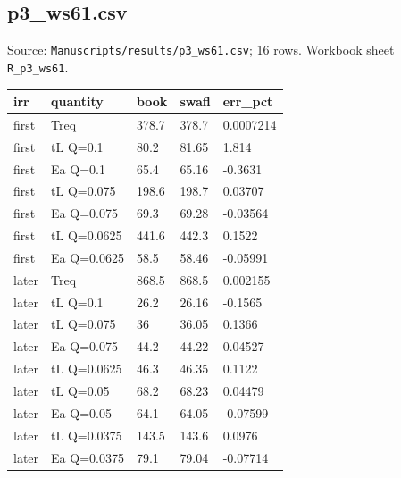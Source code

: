 \subsection*{p3\_ws61.csv}
\noindent\small Source: \nolinkurl{Manuscripts/results/p3_ws61.csv}; 16 rows. Workbook sheet \texttt{R\_p3\_ws61}.\par
{\scriptsize\setlength{\tabcolsep}{3pt}\begin{longtable}{lllll}
\toprule
\textbf{irr} & \textbf{quantity} & \textbf{book} & \textbf{swafl} & \textbf{err\_\allowbreak{}pct}\\\midrule\endhead
{}first & Treq & 378.7 & 378.7 & 0.0007214\\
{}first & tL Q=0.1 & 80.2 & 81.65 & 1.814\\
{}first & Ea Q=0.1 & 65.4 & 65.16 & -0.3631\\
{}first & tL Q=0.075 & 198.6 & 198.7 & 0.03707\\
{}first & Ea Q=0.075 & 69.3 & 69.28 & -0.03564\\
{}first & tL Q=0.0625 & 441.6 & 442.3 & 0.1522\\
{}first & Ea Q=0.0625 & 58.5 & 58.46 & -0.05991\\
{}later & Treq & 868.5 & 868.5 & 0.002155\\
{}later & tL Q=0.1 & 26.2 & 26.16 & -0.1565\\
{}later & tL Q=0.075 & 36 & 36.05 & 0.1366\\
{}later & Ea Q=0.075 & 44.2 & 44.22 & 0.04527\\
{}later & tL Q=0.0625 & 46.3 & 46.35 & 0.1122\\
{}later & tL Q=0.05 & 68.2 & 68.23 & 0.04479\\
{}later & Ea Q=0.05 & 64.1 & 64.05 & -0.07599\\
{}later & tL Q=0.0375 & 143.5 & 143.6 & 0.0976\\
{}later & Ea Q=0.0375 & 79.1 & 79.04 & -0.07714\\
\bottomrule
\end{longtable}}


